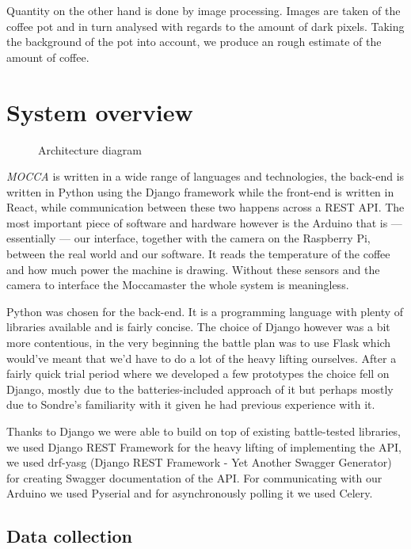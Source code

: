\documentclass[12pt,a4paper,oneside,article]{memoir}
\numberwithin{equation}{chapter}
\begin{document}
Quantity on the other hand is done by image processing. Images are taken of the
coffee pot and in turn analysed with regards to the amount of dark pixels.
Taking the background of the pot into account, we produce an rough estimate of
the amount of coffee.


\section{System overview}\label{sec:technical-details}
\begin{figure}[h]
  \centering
  \scalebox{.75}{}
  \caption{Architecture diagram}\label{fig:architecture}
\end{figure}
\textit{MOCCA} is written in a wide range of languages and technologies, the
back-end is written in Python using the Django framework while the front-end is
written in React, while communication between these two happens across a REST
API.
The most important piece of software and hardware however is the Arduino
that is --- essentially --- our interface, together with the camera on the 
Raspberry Pi, between the real world and our software. It reads the temperature 
of the coffee and how much power the machine is drawing. Without these sensors 
and the camera to interface the Moccamaster the whole system is meaningless. 

Python was chosen for the back-end. It is a programming language with plenty of 
libraries available and is fairly concise. The choice of Django however was a 
bit more contentious, in the very beginning the battle plan was to use Flask 
which would've meant that we'd have to do a lot of the heavy lifting ourselves.
After a fairly quick trial period where we developed a few prototypes the choice
fell on Django, mostly due to the batteries-included approach of it but perhaps
mostly due to Sondre's familiarity with it given he had previous experience with
it.

Thanks to Django we were able to build on top of existing battle-tested
libraries, we used Django REST Framework for the heavy lifting of implementing
the API, we used drf-yasg (Django REST Framework - Yet Another Swagger
Generator) for creating Swagger documentation of the API. For communicating with
our Arduino we used Pyserial and for asynchronously polling it we used Celery.

\subsection{Data collection}\label{sec:data-collection}
\end{document}

